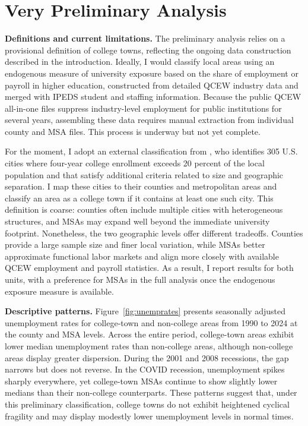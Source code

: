 
\newpage
\section{ Very Preliminary Analysis}

\noindent\textbf{Definitions and current limitations.} The preliminary analysis relies on a provisional definition of college towns, reflecting the ongoing data construction described in the introduction. Ideally, I would classify local areas using an endogenous measure of university exposure based on the share of employment or payroll in higher education, constructed from detailed QCEW industry data and merged with IPEDS student and staffing information. Because the public QCEW all-in-one files suppress industry-level employment for public institutions for several years, assembling these data requires manual extraction from individual county and MSA files. This process is underway but not yet complete.

For the moment, I adopt an external classification from \citet{GumprechtBook}, who identifies 305 U.S. cities where four-year college enrollment exceeds 20 percent of the local population and that satisfy additional criteria related to size and geographic separation. I map these cities to their counties and metropolitan areas and classify an area as a college town if it contains at least one such city. This definition is coarse: counties often include multiple cities with heterogeneous structures, and MSAs may expand well beyond the immediate university footprint. Nonetheless, the two geographic levels offer different tradeoffs. Counties provide a large sample size and finer local variation, while MSAs better approximate functional labor markets and align more closely with available QCEW employment and payroll statistics. As a result, I report results for both units, with a preference for MSAs in the full analysis once the endogenous exposure measure is available.

\noindent\textbf{Descriptive patterns.} Figure~\ref{fig:unemprates} presents seasonally adjusted unemployment rates for college-town and non-college areas from 1990 to 2024 at the county and MSA levels. Across the entire period, college-town areas exhibit lower median unemployment rates than non-college areas, although non-college areas display greater dispersion. During the 2001 and 2008 recessions, the gap narrows but does not reverse. In the COVID recession, unemployment spikes sharply everywhere, yet college-town MSAs continue to show slightly lower medians than their non-college counterparts. These patterns suggest that, under this preliminary classification, college towns do not exhibit heightened cyclical fragility and may display modestly lower unemployment levels in normal times.

